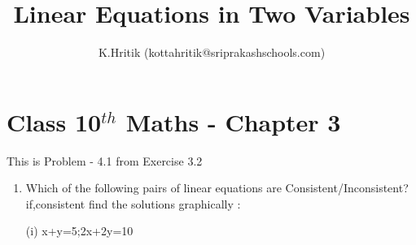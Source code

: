 \documentclass[12pt]{article}
\title{Linear Equations in Two Variables}
\author{K.Hritik (kottahritik@sriprakashschools.com)}
\begin{document}
\maketitle
\section*{Class 10$^{th}$ Maths - Chapter 3}
This is Problem - 4.1 from Exercise 3.2
\begin{enumerate}
\item Which of the following pairs of linear equations are Consistent/Inconsistent?if,consistent find the solutions graphically :


(i) x+y=5;2x+2y=10 \\

\end{enumerate}
\end{document}
